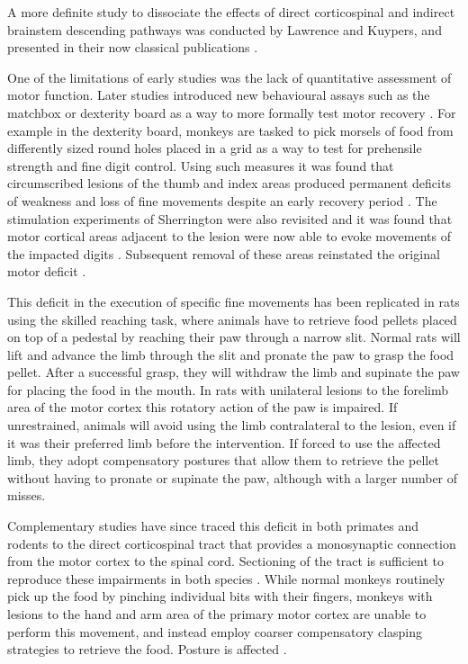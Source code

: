 A more definite study to dissociate the effects of direct corticospinal and indirect brainstem descending pathways was conducted by Lawrence and Kuypers, and presented in their now classical publications \cite{Lawrence1968,Lawrence1968a}.

One of the limitations of early studies was the lack of quantitative assessment of motor function. Later studies introduced new behavioural assays such as the matchbox or dexterity board as a way to more formally test motor recovery \cite{Glees1950,Cole1952}. For example in the dexterity board, monkeys are tasked to pick morsels of food from differently sized round holes placed in a grid as a way to test for prehensile strength and fine digit control. Using such measures it was found that circumscribed lesions of the thumb and index areas produced permanent deficits of weakness and loss of fine movements despite an early recovery period \cite{Glees1950}. The stimulation experiments of Sherrington were also revisited and it was found that motor cortical areas adjacent to the lesion were now able to evoke movements of the impacted digits \cite{Glees1950}. Subsequent removal of these areas reinstated the original motor deficit \cite{Glees1950}.

This deficit in the execution of specific fine movements has been replicated in rats using the skilled reaching task, where animals have to retrieve food pellets placed on top of a pedestal by reaching their paw through a narrow slit. Normal rats will lift and advance the limb through the slit and pronate the paw to grasp the food pellet. After a successful grasp, they will withdraw the limb and supinate the paw for placing the food in the mouth. In rats with unilateral lesions to the forelimb area of the motor cortex this rotatory action of the paw is impaired. If unrestrained, animals will avoid using the limb contralateral to the lesion, even if it was their preferred limb before the intervention. If forced to use the affected limb, they adopt compensatory postures that allow them to retrieve the pellet without having to pronate or supinate the paw, although with a larger number of misses.

Complementary studies have since traced this deficit in both primates and rodents to the direct corticospinal tract that provides a monosynaptic connection from the motor cortex to the spinal cord. Sectioning of the tract is sufficient to reproduce these impairments in both species \cite{Lawrence1968}. While normal monkeys routinely pick up the food by pinching individual bits with their fingers, monkeys with lesions to the hand and arm area of the primary motor cortex are unable to perform this movement, and instead employ coarser compensatory clasping strategies to retrieve the food. Posture is affected \cite{Lashley1924}.

